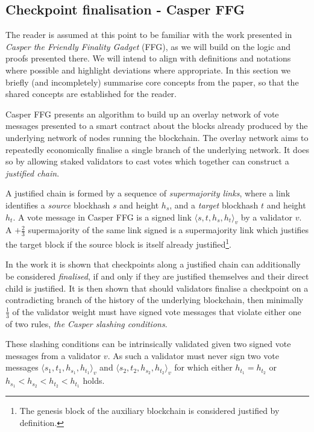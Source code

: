 \documentclass[12pt,a4paper]{article}
\begin{document}
\subsection{Checkpoint finalisation - Casper FFG}
The reader is assumed at this point to be familiar with the work presented in \textit{Casper the Friendly Finality Gadget}\cite{casperffg} (FFG), as we will build on the logic and proofs presented there.  We will intend to align with definitions and notations where possible and highlight deviations where appropriate. In this section we briefly (and incompletely) summarise core concepts from the paper, so that the shared concepts are established for the reader.

Casper FFG presents an algorithm to build up an overlay network of vote messages presented to a smart contract about the blocks already produced by the underlying network of nodes running the blockchain.  The overlay network aims to repeatedly economically finalise a single branch of the underlying network.  It does so by allowing staked validators to cast votes which together can construct a \emph{justified chain}.

A justified chain is formed by a sequence of \emph{supermajority links}, where a link identifies a \emph{source} blockhash $s$ and height $h_s$, and a \emph{target} blockhash $t$ and height $h_t$. A vote message in Casper FFG is a signed link $\langle s, t, h_s, h_t\rangle_v$ by a validator $v$. A $+\tfrac{2}{3}$ supermajority of the same link signed is a supermajority link which justifies the target block if the source block is itself already justified\footnote{The genesis block of the auxiliary blockchain is considered justified by definition.}.

In the work it is shown that checkpoints along a justified chain can additionally be considered \emph{finalised}, if and only if they are justified themselves and their direct child is justified.  It is then shown that should validators finalise a checkpoint on a contradicting branch of the history of the underlying blockchain, then minimally $\tfrac{1}{3}$ of the validator weight must have signed vote messages  that violate either one of two rules, \emph{the Casper slashing conditions}.

These slashing conditions can be intrinsically validated given two signed vote messages from a validator $v$.  As such a validator must never sign two vote messages $\langle s_1, t_1, h_{s_1}, h_{t_1}\rangle_v$ and $\langle s_2, t_2, h_{s_2}, h_{t_2}\rangle_v$ for which either $h_{t_1} = h_{t_2}$ or $h_{s_1} < h_{s_2} < h_{t_2} < h_{t_1}$ holds.
\end{document}
